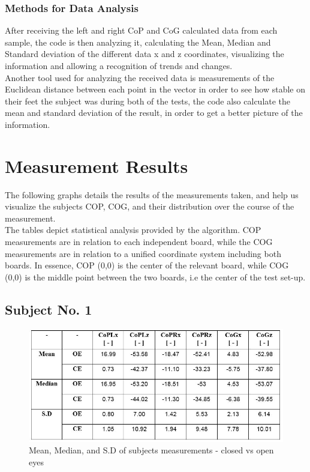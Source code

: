 \documentclass[twoside]{ctuthesis}
\theoremstyle{plain}
\theoremstyle{definition}
\theoremstyle{note}
\begin{document}
\subsection{Methods for Data Analysis}
After receiving the left and right CoP and CoG calculated data from each sample, the code is then analyzing it, calculating the Mean, Median and Standard deviation of the different data x and z coordinates, visualizing the information and allowing a recognition of trends and changes.\\
Another tool used for analyzing the received data is measurements of the Euclidean distance between each point in the vector in order to see how stable on their feet the subject was during both of the tests, the code also calculate the mean and standard deviation of the result, in order to get a better picture of the information. 

\pagebreak

\begingroup
\renewcommand{\cleardoublepage}{}
\renewcommand{\clearpage}{}
\chapter{Measurement Results}
\endgroup
The following graphs details the results of the measurements taken, and help us visualize the subjects COP, COG, and their distribution over the course of the measurement. \\ 
The tables depict statistical analysis provided by the algorithm. COP measurements are in relation to each independent board, while the COG measurements are in relation to a unified coordinate system including both boards. In essence, COP (0,0) is the center of the relevant board, while COG (0,0) is the middle point between the two boards, i.e the center of the test set-up.

\section{Subject No. 1}

\begin{figure}[H]
	\centering
	\includegraphics[width = \textwidth]{Patient1DataTable}
	\begin{table}[H]
		\caption{Mean, Median, and S.D of subjects measurements - closed vs open eyes}
	\end{table}
\end{figure}
\end{document}
